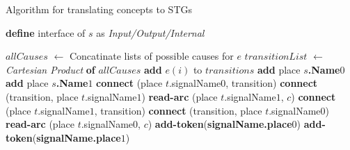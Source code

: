 \documentclass[british,conference,compsoc]{IEEEtran}
\begin{document}
\begin{algorithm}[H]
\begin{algorithmic}
\caption{Algorithm for translating concepts to STGs\label{alg:translation}}
  \State \textbf{define} interface of $s$ as \emph{Input/Output/Internal}
\EndFor

  \State $allCauses$ $\leftarrow$ Concatinate lists of possible causes for $e$
  \State $transitionList$ $\leftarrow$ \emph{Cartesian Product} \textbf{of} $allCauses$
    \State \textbf{add} $e(i)$ to $transitions$
  \EndFor 
\EndFor
{}
  \State \textbf{add} place \textbf{$s$.Name}$0$
  \State \textbf{add} place \textbf{$s$.Name}$1$
\EndFor
{}
    \State \textbf{connect} (place $t$.signalName$0$, transition)
    \State \textbf{connect} (transition, place $t$.signalName$1$)
      \State \textbf{read-arc} (place $t$.signalName$1$, $c$)
    \EndFor
  \EndIf
    \State \textbf{connect} (place $t$.signalName$1$, transition)
    \State \textbf{connect} (transition, place $t$.signalName$0$)
      \State \textbf{read-arc} (place $t$.signalName$0$, $c$)
    \EndFor
  \EndIf
\EndFor
{}
    \State \textbf{add-token}(\textbf{signalName.place}$0$)
  \EndIf 
    \State \textbf{add-token}(\textbf{signalName.place}$1$)
  \EndIf
\EndFor
\end{algorithmic}
\end{algorithm}

%
%
%
\end{document}
